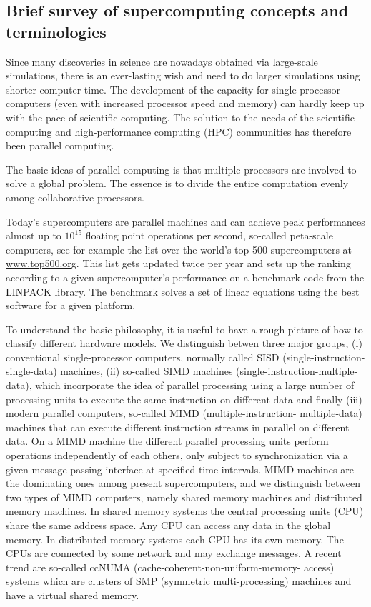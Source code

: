\subsection{Brief survey of supercomputing concepts and terminologies}

Since many discoveries in science are nowadays obtained via 
large-scale simulations,  
there is an ever-lasting wish and need 
to do larger simulations using shorter computer time. 
The development of the capacity for single-processor computers (even with increased processor speed and memory) 
can hardly keep up with the pace of scientific computing.  
The solution to the needs of the scientific computing and high-performance computing (HPC) 
communities has therefore been parallel computing.

The basic ideas of parallel computing is that 
multiple processors are involved to solve a global problem. 
The essence is to divide the entire computation evenly among
collaborative processors.

Today's supercomputers are parallel machines and can achieve peak performances 
almost up to $10^{15}$ floating point operations 
per second, so-called peta-scale computers, see for example 
the list over the world's top 500 supercomputers at \url{www.top500.org}.
This list gets updated twice per year and sets up the ranking according to a given supercomputer's
performance on a benchmark code from the LINPACK library. The benchmark solves a set of linear equations
using the best software for a given platform. 


To understand the basic philosophy, it is useful to have a rough picture of how to classify different hardware 
models. We distinguish betwen three major groups, (i)
conventional single-processor computers, normally  called SISD
(single-instruction-single-data) machines, (ii) 
so-called SIMD machines (single-instruction-multiple-data), which incorporate the
idea of parallel processing using  a large number of processing units to execute the same instruction on different data and finally (iii)
modern parallel computers,  so-called MIMD (multiple-instruction-
multiple-data) machines that can execute different instruction
streams in parallel on different data.
On a MIMD machine the different parallel processing units perform operations independently 
of each others, only subject to synchronization via a given message passing interface at specified
time intervals. 
MIMD machines are the dominating ones among present supercomputers, and we distinguish between two
types of MIMD  computers, namely shared memory machines and distributed memory machines. 
In shared memory systems the central processing units (CPU) share the same address
space. Any CPU can access any data in the global memory.
In distributed memory systems each CPU has its own memory.
The CPUs are connected by some network and may exchange
messages. A recent trend are so-called ccNUMA (cache-coherent-non-uniform-memory-
access) systems which are clusters of SMP (symmetric multi-processing) machines and have a virtual shared memory.

